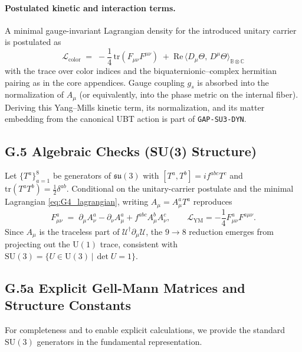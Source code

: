 \paragraph{Postulated kinetic and interaction terms.}
A minimal gauge-invariant Lagrangian density for the introduced unitary carrier is postulated as
\begin{equation}
\label{eq:G4_lagrangian}
\mathcal{L}_{\mathrm{color}}\;=\; -\frac{1}{4}\,\mathrm{tr}(F_{\mu\nu}F^{\mu\nu})
\;+\; \mathrm{Re}\,\Big\langle D_\mu\Theta,\, D^\mu\Theta\Big\rangle_{\! \mathbb{B}\otimes \mathbb{C}}
\end{equation}
with the trace over color indices and the biquaternionic–complex hermitian pairing as in the core appendices. 
Gauge coupling $g_s$ is absorbed into the normalization of $A_\mu$ (or equivalently, into the phase metric on the internal fiber).  Deriving this Yang--Mills kinetic term, its normalization, and its matter embedding from the canonical UBT action is part of \texttt{GAP-SU3-DYN}.

\subsection*{G.5 Algebraic Checks (SU(3) Structure)}
Let $\{T^a\}_{a=1}^8$ be generators of $\mathfrak{su}(3)$ with 
$[T^a,T^b]= i f^{abc} T^c$ and $\mathrm{tr}(T^a T^b)=\frac{1}{2}\delta^{ab}$.
Conditional on the unitary-carrier postulate and the minimal Lagrangian \eqref{eq:G4_lagrangian}, writing $A_\mu = A_\mu^a T^a$ reproduces
\begin{equation}
F_{\mu\nu}^a \;=\;\partial_\mu A_\nu^a-\partial_\nu A_\mu^a + f^{abc} A_\mu^b A_\nu^c,
\qquad 
\mathcal{L}_{\mathrm{YM}} = -\frac{1}{4} F_{\mu\nu}^a F^{a\mu\nu}.
\end{equation}
Since $A_\mu$ is the traceless part of $\mathcal{U}^\dagger \partial_\mu \mathcal{U}$, 
the $9\to 8$ reduction emerges from projecting out the $\mathrm{U}(1)$ trace, consistent with 
$\mathrm{SU}(3)=\{U\in \mathrm{U}(3)\,|\,\det U=1\}$.

\subsection*{G.5a Explicit Gell-Mann Matrices and Structure Constants}
\label{sec:G5a_gellmann}

For completeness and to enable explicit calculations, we provide the standard $\mathrm{SU}(3)$ generators in the fundamental representation.

